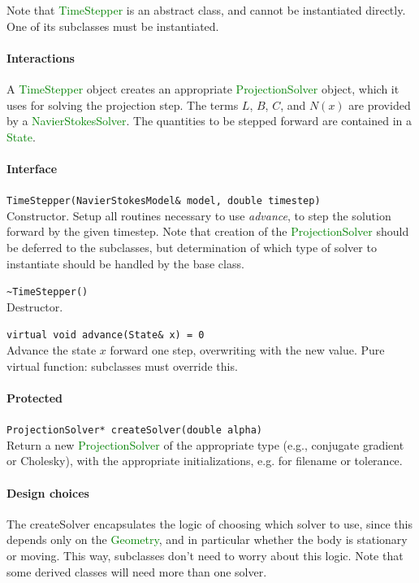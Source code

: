\documentclass[11pt]{article}
\def\class#1{\textcolor{green}{\ttfamily\small #1}} %
\def\fn#1{{\ttfamily\small #1}} %
\def\virtualfn#1{{\ttfamily\small\slshape #1}} %
\let\code\lstinline
\begin{document}
Note that \class{TimeStepper} is an abstract class, and cannot be instantiated directly.  One of its subclasses must be instantiated.

\paragraph{Interactions}
A \class{TimeStepper} object creates an appropriate \class{ProjectionSolver} object, which it uses for solving the projection step.  The terms $L$, $B$, $C$, and $N(x)$ are provided by a \class{NavierStokesSolver}.  The quantities to be stepped forward are contained in a \class{State}.

\paragraph{Interface}
\begin{description}
	\item \code|TimeStepper(NavierStokesModel& model, double timestep)|\\
		Constructor.  Setup all routines necessary to use \virtualfn{advance}, to step the solution forward by the given timestep.  Note that creation of the \class{ProjectionSolver} should be deferred to the subclasses, but determination of which type of solver to instantiate should be handled by the base class.
	\item \code|~TimeStepper()|\\
		Destructor.
	\item \code|virtual void advance(State& x) = 0|\\
	 	Advance the state $x$ forward one step, overwriting with the new value.  Pure virtual function: subclasses must override this.
\end{description}
\paragraph{Protected}
\begin{description}
	\item \code|ProjectionSolver* createSolver(double alpha)|\\
		Return a new \class{ProjectionSolver} of the appropriate type (e.g., conjugate gradient or Cholesky), with the appropriate initializations, e.g. for filename or tolerance.
	\end{description}

\paragraph{Design choices}
The \fn{createSolver} encapsulates the logic of choosing which solver to use, since this depends only on the \class{Geometry}, and in particular whether the body is stationary or moving.  This way, subclasses don't need to worry about this logic.  Note that some derived classes will need more than one solver.
\end{document}
